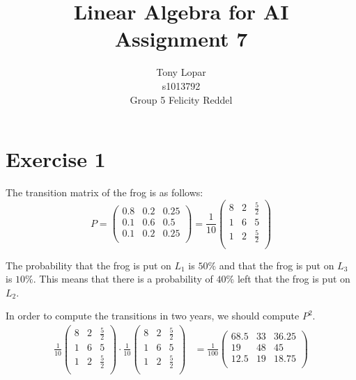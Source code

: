 \documentclass[a4paper]{article}
\title{Linear Algebra for AI\\Assignment 7}
\author{Tony Lopar \\ s1013792 \\ Group 5 \quad Felicity Reddel}
\begin{document}
\maketitle

\section*{Exercise 1}
The transition matrix of the frog is as follows:
\[ P =
\left(
\begin{array}{ccc}
0.8 & 0.2 & 0.25 \\
0.1 & 0.6 & 0.5  \\
0.1 & 0.2 & 0.25 \\
\end{array}
\right)
=
\frac{1}{10}
\left(
\begin{array}{ccc}
8 & 2 & \frac{5}{2} \\
1 & 6 & 5  \\
1 & 2 & \frac{5}{2} \\
\end{array}
\right)
\]

The probability that the frog is put on $L_1$ is $50 \%$ and that the frog is put on $L_3$ is $10 \%$. This means that there is a probability of $40 \%$ left that the frog is put on $L_2$.

In order to compute the transitions in two years, we should compute $P^2$.
\begin{align*}
\frac{1}{10}
\left(
\begin{array}{ccc}
8 & 2 & \frac{5}{2} \\
1 & 6 & 5  \\
1 & 2 & \frac{5}{2} \\
\end{array}
\right)
\cdot
\frac{1}{10}
\left(
\begin{array}{ccc}
8 & 2 & \frac{5}{2} \\
1 & 6 & 5  \\
1 & 2 & \frac{5}{2} \\
\end{array}
\right)
&=
\frac{1}{100}
\left(
\begin{array}{ccc}
68.5 & 33 & 36.25 \\
19 & 48 & 45  \\
12.5 & 19 & 18.75 \\
\end{array}
\right)
\end{align*}
\end{document}
